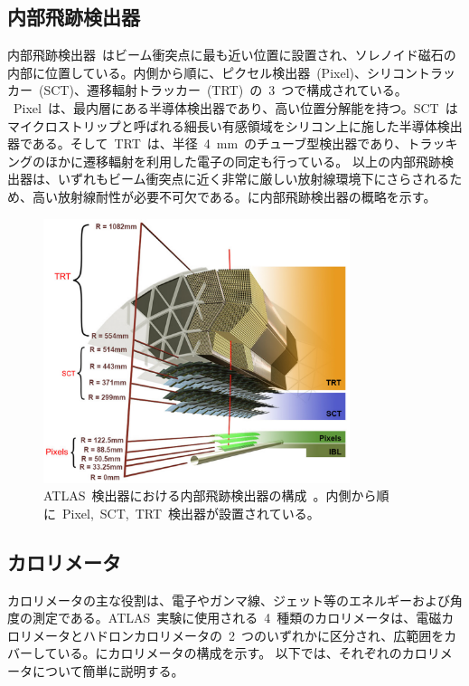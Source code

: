 \subsection{内部飛跡検出器}
内部飛跡検出器~\cite{URL:19}はビーム衝突点に最も近い位置に設置され、ソレノイド磁石の内部に位置している。内側から順に、ピクセル検出器~(Pixel)、シリコントラッカー~(SCT)、遷移輻射トラッカー~(TRT)~の~3~つで構成されている。
~Pixel~は、最内層にある半導体検出器であり、高い位置分解能を持つ。SCT~はマイクロストリップと呼ばれる細長い有感領域をシリコン上に施した半導体検出器である。そして~TRT~は、半径~4~mm~のチューブ型検出器であり、トラッキングのほかに遷移輻射を利用した電子の同定も行っている。
以上の内部飛跡検出器は、いずれもビーム衝突点に近く非常に厳しい放射線環境下にさらされるため、高い放射線耐性が必要不可欠である。に内部飛跡検出器の概略を示す。

\begin{figure}[H]
    \centering   
    \includegraphics[width=0.8\textwidth,page=1]{img/jpeg/id.pdf}
    \caption[ATLAS~検出器における内部飛跡検出器の構成]{ATLAS~検出器における内部飛跡検出器の構成~\cite{URL:19}。内側から順に~Pixel,~SCT,~TRT~検出器が設置されている。}\label{fig:innr}
\end{figure}

\subsection{カロリメータ}
カロリメータの主な役割は、電子やガンマ線、ジェット等のエネルギーおよび角度の測定である。ATLAS~実験に使用される~4~種類のカロリメータは、電磁カロリメータとハドロンカロリメータの~2~つのいずれかに区分され、広範囲をカバーしている。にカロリメータの構成を示す。
以下では、それぞれのカロリメータについて簡単に説明する。

